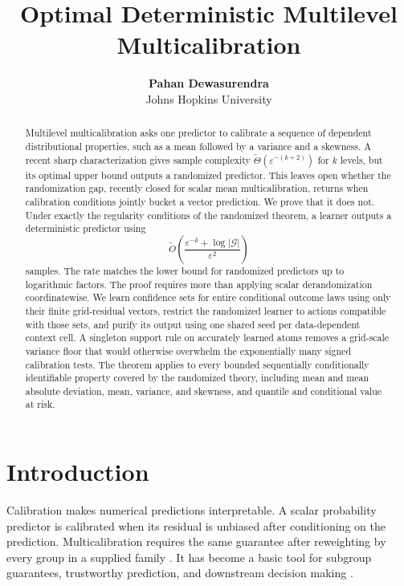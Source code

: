 \documentclass{article}
\title{Optimal Deterministic Multilevel Multicalibration}
\author{\textbf{Pahan Dewasurendra} \\ Johns Hopkins University}
\theoremstyle{definition}
\theoremstyle{remark}
\newcommand{\1}{\mathbf 1}
\begin{document}
\maketitle

\begin{abstract}
Multilevel multicalibration asks one predictor to calibrate a sequence of dependent distributional properties, such as a mean followed by a variance and a skewness. A recent sharp characterization gives sample complexity $\widetilde\Theta(\varepsilon^{-(k+2)})$ for $k$ levels, but its optimal upper bound outputs a randomized predictor. This leaves open whether the randomization gap, recently closed for scalar mean multicalibration, returns when calibration conditions jointly bucket a vector prediction. We prove that it does not. Under exactly the regularity conditions of the randomized theorem, a learner outputs a deterministic predictor using
\[
\widetilde O\!\left(\frac{\varepsilon^{-k}+\log |\mathcal G|}{\varepsilon^2}\right)
\]
samples. The rate matches the lower bound for randomized predictors up to logarithmic factors. The proof requires more than applying scalar derandomization coordinatewise. We learn confidence sets for entire conditional outcome laws using only their finite grid-residual vectors, restrict the randomized learner to actions compatible with those sets, and purify its output using one shared seed per data-dependent context cell. A singleton support rule on accurately learned atoms removes a grid-scale variance floor that would otherwise overwhelm the exponentially many signed calibration tests. The theorem applies to every bounded sequentially conditionally identifiable property covered by the randomized theory, including mean and mean absolute deviation, mean, variance, and skewness, and quantile and conditional value at risk.
\end{abstract}

\section{Introduction}

Calibration makes numerical predictions interpretable. A scalar probability predictor is calibrated when its residual is unbiased after conditioning on the prediction. Multicalibration requires the same guarantee after reweighting by every group in a supplied family \citep{hebertjohnson2018multicalibration}. It has become a basic tool for subgroup guarantees, trustworthy prediction, and downstream decision making \citep{noarovroth2023scope,gopalan2022omnipredictors}.
\end{document}
